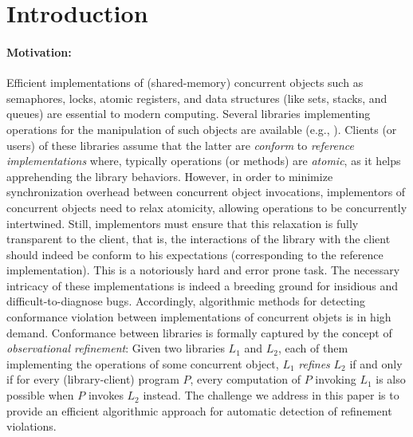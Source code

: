 \section{Introduction}


\paragraph{Motivation:} Efficient implementations of (shared-memory) concurrent objects such as semaphores, locks, atomic registers, and data structures (like sets, stacks, and queues) are essential to modern computing. Several libraries implementing operations for the manipulation of such objects are available (e.g., \cite{}). Clients (or users) of these libraries assume that the latter are {\em conform} to {\em reference implementations} where, typically operations (or methods) are {\em atomic}, as it helps apprehending the library behaviors. However, in order to minimize synchronization overhead between concurrent object invocations, implementors of concurrent objects need to relax atomicity, allowing operations to be concurrently intertwined. Still, implementors must ensure that this relaxation is fully transparent to the client, that is, the interactions of the library with the client should indeed be conform to his expectations (corresponding to the reference implementation). This is a notoriously hard and error prone task. The necessary intricacy of these implementations is indeed a breeding ground for insidious and difficult-to-diagnose bugs. Accordingly, algorithmic methods for detecting conformance violation between implementations of concurrent objets is in high demand.
%
Conformance between libraries is formally captured by the concept of \emph{observational refinement}: Given two libraries $L_1$ and $L_2$, each of them implementing the operations of some concurrent object, $L_1$ {\em refines} $L_2$ if and only if for every (library-client) program $P$, every computation of $P$ invoking $L_1$ is also possible when $P$ invokes $L_2$ instead. 
%
The challenge we address in this paper is to provide an efficient algorithmic approach for automatic detection of refinement violations. 

